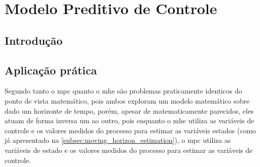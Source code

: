 \chapter{Modelo Preditivo de Controle}
\label{ch:mpc}

\section{Introdução}



\section{Aplicação prática}
\label{sec:aplicacao_pratica}

Segundo  tanto o \acrshort{mpc} quanto o \acrshort{mhe} são problemas praticamente
identicos do ponto de vista matemático, pois ambos exploram um modelo matemático sobre dado um horizonte de
tempo, porém, apesar de matematicamente parecidos, eles atuam de forma inversa um ao outro, pois
enquanto o \acrshort{mhe} utiliza as variáveis de controle e os valores medidos do processo para estimar
as variáveis estados (como já apresentado na \cref{subsec:moving_horizon_estimation}), o \acrshort{mpc}
utiliza as variáveis de estado e os valores medidos do processo para estimar as variáveis de controle.



